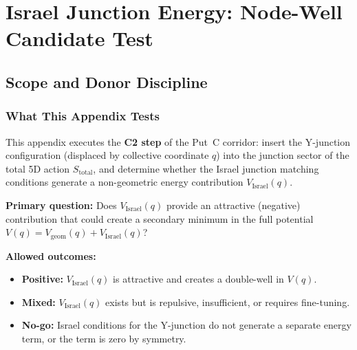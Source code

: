 
\chapter{Israel Junction Energy: Node-Well Candidate Test}
\label{app:P2_WP2_Israel}

\section{Scope and Donor Discipline}
\label{sec:P2WP2:scope}

\subsection{What This Appendix Tests}

This appendix executes the \textbf{C2 step} of the Put~C corridor:
insert the Y-junction configuration (displaced by collective coordinate $q$)
into the junction sector of the total 5D action $S_{\mathrm{total}}$,
and determine whether the Israel junction matching conditions generate
a non-geometric energy contribution $V_{\mathrm{Israel}}(q)$.

\textbf{Primary question:} Does $V_{\mathrm{Israel}}(q)$ provide an
attractive (negative) contribution that could create a secondary minimum
in the full potential $V(q) = V_{\mathrm{geom}}(q) + V_{\mathrm{Israel}}(q)$?

\textbf{Allowed outcomes:}
\begin{itemize}
    \item \textbf{Positive:} $V_{\mathrm{Israel}}(q)$ is attractive and
          creates a double-well in $V(q)$.
    \item \textbf{Mixed:} $V_{\mathrm{Israel}}(q)$ exists but is
          repulsive, insufficient, or requires fine-tuning.
    \item \textbf{No-go:} Israel conditions for the Y-junction do not
          generate a separate energy term, or the term is zero by symmetry.
\end{itemize}

